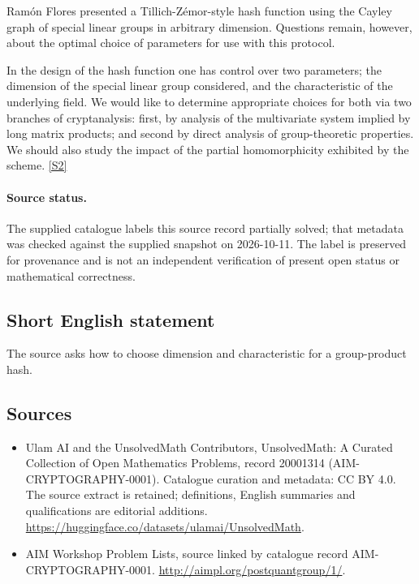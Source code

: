 \documentclass[11pt]{article}
\newcommand{\sref}[2]{\hyperlink{source:#1:#2}{[S#2]}}
\begin{document}
Ramón Flores presented a Tillich-Zémor-style hash function using the Cayley graph of special linear groups in arbitrary dimension. Questions remain, however, about the optimal choice of parameters for use with this protocol.

In the design of the hash function one has control over two parameters; the dimension of the special linear group considered, and the characteristic of the underlying field. We would like to determine appropriate choices for both via two branches of cryptanalysis: first, by analysis of the multivariate system implied by long matrix products; and second by direct analysis of group-theoretic properties. We should also study the impact of the partial homomorphicity exhibited by the scheme. \sref{20001314}{2}
\paragraph{Source status.}
The supplied catalogue labels this source record partially solved; that metadata was checked against the supplied snapshot on 2026-10-11. The label is preserved for provenance and is not an independent verification of present open status or mathematical correctness.
\subsection{Short English statement}
The source asks how to choose dimension and characteristic for a group-product hash.
\subsection{Sources}
\begin{itemize}
\item[\hypertarget{source:20001314:1}{S1}] Ulam AI and the UnsolvedMath Contributors, UnsolvedMath: A Curated Collection of Open Mathematics Problems, record 20001314 (AIM-CRYPTOGRAPHY-0001). Catalogue curation and metadata: CC BY 4.0. The source extract is retained; definitions, English summaries and qualifications are editorial additions.
\url{https://huggingface.co/datasets/ulamai/UnsolvedMath}.
\item[\hypertarget{source:20001314:2}{S2}] AIM Workshop Problem Lists, source linked by catalogue record AIM-CRYPTOGRAPHY-0001.
\url{http://aimpl.org/postquantgroup/1/}.
\end{itemize}
\end{document}
